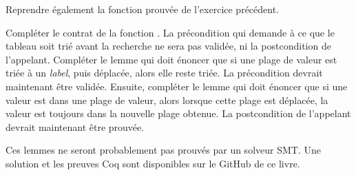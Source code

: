 Reprendre également la fonction prouvée  de l'exercice
précédent.


Compléter le contrat de la fonction . La
précondition qui demande à ce que le tableau soit trié avant la recherche ne
sera pas validée, ni la postcondition de l'appelant. Compléter le lemme
 qui doit énoncer que si une plage de valeur
est triée à un \textit{label}, puis déplacée, alors elle reste triée. La
précondition devrait maintenant être validée. Ensuite, compléter le lemme
 qui doit énoncer que si une valeur est dans
une plage de valeur, alors lorsque cette plage est déplacée, la valeur est
toujours dans la nouvelle plage obtenue. La postcondition de l'appelant devrait
maintenant être prouvée.


Ces lemmes ne seront probablement pas prouvés par un solveur SMT. Une solution et
les preuves Coq sont disponibles sur le GitHub de ce livre.
